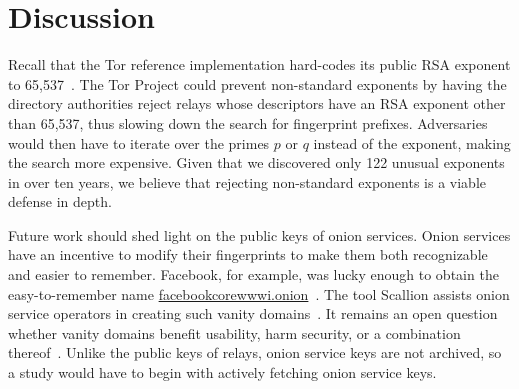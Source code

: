 \section{Discussion}
\label{sec:discussion}
Recall that the Tor reference implementation hard-codes its public RSA exponent
to 65,537~\cite[\S~0.3]{torspec}.  The Tor Project could prevent non-standard
exponents by having the directory authorities reject relays whose descriptors
have an RSA exponent other than 65,537, thus slowing down the search for
fingerprint prefixes.  Adversaries would then have to iterate over the primes
$p$ or $q$ instead of the exponent, making the search more expensive.  Given
that we discovered only 122 unusual exponents in over ten years, we believe that
rejecting non-standard exponents is a viable defense in depth.

Future work should shed light on the public keys of onion services.  Onion
services have an incentive to modify their fingerprints to make them both
recognizable and easier to remember.  Facebook, for example, was lucky enough to
obtain the easy-to-remember name \url{facebookcorewwwi.onion}~\cite{facebook}.
The tool Scallion assists onion service operators in creating such vanity
domains~\cite{scallion}.  It remains an open question whether vanity domains
benefit usability, harm security, or a combination
thereof~\cite{vanity-domains}.  Unlike the public keys of relays, onion service
keys are not archived, so a study would have to begin with actively fetching
onion service keys.

